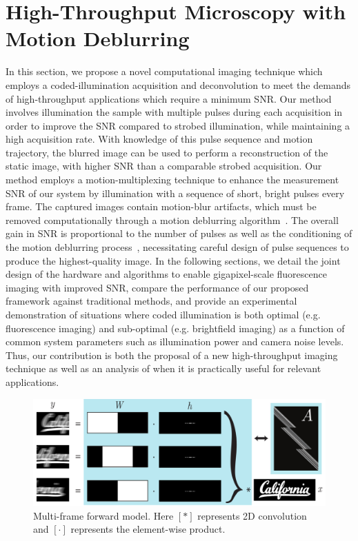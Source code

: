 \section{High-Throughput Microscopy with Motion Deblurring}
In this section, we propose a novel computational imaging technique which employs a coded-illumination acquisition and deconvolution to meet the demands of high-throughput applications which require a minimum SNR. Our method involves illumination the sample with multiple pulses during each acquisition in order to improve the SNR compared to strobed illumination, while maintaining a high acquisition rate. With knowledge of this pulse sequence and motion trajectory, the blurred image can be used to perform a reconstruction of the static image, with higher SNR than a comparable strobed acquisition. Our method employs a motion-multiplexing technique to enhance the measurement SNR of our system by illumination with a sequence of short, bright pulses every frame. The captured images contain motion-blur artifacts, which must be removed computationally through a motion deblurring algorithm~\cite{raskar2006coded}. The overall gain in SNR is proportional to the number of pulses as well as the conditioning of the motion deblurring process~\cite{agrawal2009optimal}, necessitating careful design of pulse sequences to produce the highest-quality image. In the following sections, we detail the joint design of the hardware and algorithms to enable gigapixel-scale fluorescence imaging with improved SNR,
compare the performance of our proposed framework against traditional methods, and provide an experimental demonstration of situations where coded illumination is both optimal (e.g. fluorescence imaging) and sub-optimal (e.g. brightfield imaging) as a function of common system parameters such as illumination power and camera noise levels. Thus, our contribution is both the proposal of a new high-throughput imaging technique as well as an analysis of when it is practically useful for relevant applications.

\begin{figure}
  \centering
    \includegraphics[width=\textwidth]{figures/fig_highthroughput_forward_model.pdf}
  \caption{\label{fig:forward_model}Multi-frame forward model. Here $[*]$ represents 2D convolution and $[\cdot]$ represents the element-wise product.}
\end{figure}

